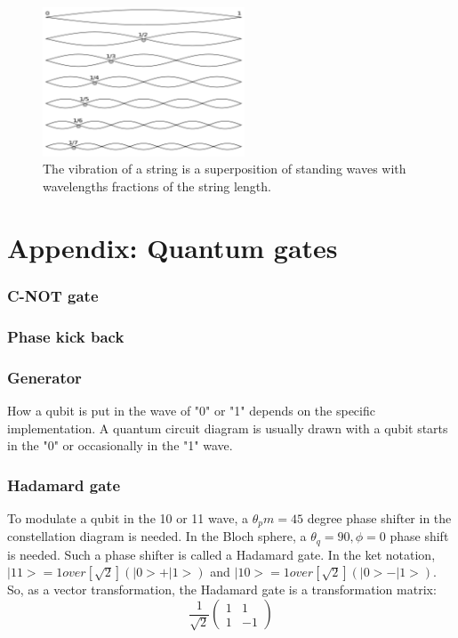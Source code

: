 \documentclass{book}
\begin{document}
\begin{figure}[ht]
\includegraphics[width=6cm]{pic/overtones.png}
\caption{The vibration of a string is a superposition of standing waves with wavelengths fractions of the string length.}
\label{Overtones}
\end{figure}

\chapter{Appendix: Quantum gates}

\subsection{C-NOT gate}
\subsection{Phase kick back}

\subsection{Generator}
How a qubit is put in the wave of "0" or "1" depends on the specific implementation. A quantum circuit diagram is usually drawn with a qubit starts in the "0" or occasionally in the "1" wave.

\subsection{Hadamard gate}
To modulate a qubit in the 10 or 11 wave, a $\theta_pm = 45$ degree phase shifter in the constellation diagram is needed. In the Bloch sphere, a $\theta_q =90, \phi=0$ phase shift is needed. Such a phase shifter is called a Hadamard gate. In the ket notation, $|11> = 1 over [\sqrt 2] (|0> + |1>)$ and $|10> = 1 over [\sqrt 2] (|0> - |1>)$. So, as a vector transformation, the Hadamard gate is a transformation matrix:
\begin{equation}
    \frac 1 {\sqrt 2}
    \begin{pmatrix}
1 & 1 \\
1 & -1
\end{pmatrix}
\end{equation}


\backmatter
{}
\printindex
\end{document}
